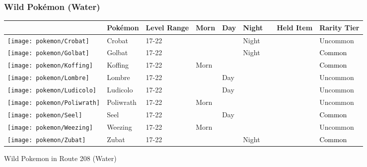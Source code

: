 \subsubsection{Wild Pokémon (Water)}%
\label{ssubsec:WildPokmon(Water)}%
\begin{longtable}{||l l l l l l l l l||}%
\hline%
\rowcolor{WaterColor}%
&Pokémon&Level Range&Morn&Day&Night&&Held Item&Rarity Tier\\%
\hline%
\endhead%
\hline%
\rowcolor{WaterColor}%
\texttt{[image: pokemon/Crobat]}&Crobat&17{-}22&&&Night&&&\textcolor{OliveGreen}{%
Uncommon%
}\\%
\hline%
\rowcolor{WaterColor}%
\texttt{[image: pokemon/Golbat]}&Golbat&17{-}22&&&Night&&&\textcolor{black}{%
Common%
}\\%
\hline%
\rowcolor{WaterColor}%
\texttt{[image: pokemon/Koffing]}&Koffing&17{-}22&Morn&&&&&\textcolor{black}{%
Common%
}\\%
\hline%
\rowcolor{WaterColor}%
\texttt{[image: pokemon/Lombre]}&Lombre&17{-}22&&Day&&&&\textcolor{OliveGreen}{%
Uncommon%
}\\%
\hline%
\rowcolor{WaterColor}%
\texttt{[image: pokemon/Ludicolo]}&Ludicolo&17{-}22&&Day&&&&\textcolor{OliveGreen}{%
Uncommon%
}\\%
\hline%
\rowcolor{WaterColor}%
\texttt{[image: pokemon/Poliwrath]}&Poliwrath&17{-}22&Morn&&&&&\textcolor{OliveGreen}{%
Uncommon%
}\\%
\hline%
\rowcolor{WaterColor}%
\texttt{[image: pokemon/Seel]}&Seel&17{-}22&&Day&&&&\textcolor{black}{%
Common%
}\\%
\hline%
\rowcolor{WaterColor}%
\texttt{[image: pokemon/Weezing]}&Weezing&17{-}22&Morn&&&&&\textcolor{OliveGreen}{%
Uncommon%
}\\%
\hline%
\rowcolor{WaterColor}%
\texttt{[image: pokemon/Zubat]}&Zubat&17{-}22&&&Night&&&\textcolor{black}{%
Common%
}\\%
\hline%
\end{longtable}%
\caption{Wild Pokemon in Route 208 (Water)}